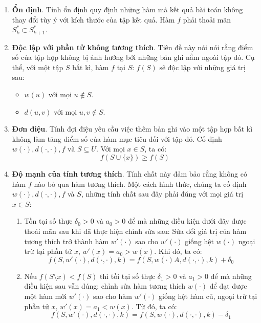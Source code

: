 \documentclass[12pt]{report}
\begin{document}
\begin{enumerate}
    \item \textbf{Ổn định}. Tính ổn định quy định những hàm mà kết quả 
        bài toán không thay đổi tùy ý với kích thước của tập kết quả. Hàm 
        $f$ phải thoải mãn $S^*_k \subset S^*_{k+1}$.

    \item \textbf{Độc lập với phần tử không tương thích}. Tiên đề này nói
        nói rằng điểm số của tập hợp không bị ảnh hưởng bởi những bản ghi 
        nằm ngoài tập đó. Cụ thể, với một tập $S$ bất kì, hàm $f$ 
        tại $S$: $f(S)$ sẽ độc lập với những giá trị sau: 
        \begin{itemize}
            \item $w(u)$ với mọi $u \notin S$.
            \item $d(u, v)$ với mọi $u, v \notin S$.  
        \end{itemize}

    \item \textbf{Đơn điệu}. Tính đợi điệu yêu cầu việc thêm bản ghi vào 
        một tập hợp bất kì không làm tăng điểm số của hàm mục tiêu đối với 
        tập đó. Cố định $w(\cdot), d(\cdot, \cdot), f \text{ và } S \subseteq U$. 
        Với mọi $x \in S$, ta có: 
        $$f(S \cup \{x\}) \geq f(S)$$

    \item \textbf{Độ mạnh của tính tương thích}. Tính chất này đảm bảo
        rằng không có hàm $f$ nào bỏ qua hàm tương thích. Một cách hình 
        thức, chúng ta cố định $w(\cdot), d(\cdot, \cdot), f$ và $S$, những tính chất 
        sau đây phải đúng với mọi giá trị $x \in S$:
        \begin{enumerate}
            \item Tồn tại số thực $\delta_0 > 0$ 
                và $a_0 > 0$ để mà những điều
                kiện dưới đây được thoải mãn sau khi đã thực hiện chỉnh 
                sửa sau: Sửa đổi giá trị của hàm tương thích trở thành hàm 
                $w'(\cdot)$ sao cho $w'(\cdot)$ 
                giống hệt $w(\cdot)$ ngoại trừ tại phần
                tử $x$, $w'(x) = a_0 > w(x)$. Khi đó, ta có: 
                $$
                f(S, w'(\cdot), d(\cdot, \cdot), k) =
                f(S, w(\cdot)A, d(\cdot, \cdot), k) + \delta_0
                $$
            \item Nếu $f(S \setminus {x}) < f(S)$ thì tồi tại số thực 
                $\delta_1 > 0$ và $a_1 > 0$ để mà những điều kiện sau vẫn 
                đúng: chỉnh sửa hàm tương thích $w(\cdot)$ để đạt được một 
                hàm mới $w'(\cdot)$ sao cho hàm $w'(\cdot)$ giống hệt hàm 
                cũ, ngoại trừ tại phần tử $x$, $w'(x) = a_1 < w(x)$. 
                Từ đó, ta có: 
                $$
                    f(S, w'(\cdot), d(\cdot, \cdot), k) = 
                    f(S, w(\cdot), d(\cdot, \cdot), k) - \delta_1
                $$
        \end{enumerate}


\end{enumerate}
\end{document}
